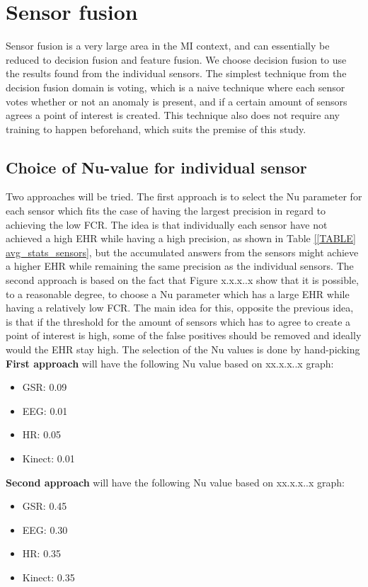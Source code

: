 \section{Sensor fusion}
Sensor fusion is a very large area in the MI context, and can essentially be reduced to decision fusion and feature fusion. 
We choose decision fusion to use the results found from the individual sensors.
The simplest technique from the decision fusion domain is voting, which is a naive technique where each sensor votes whether or not an anomaly is present, and if a certain amount of sensors agrees a point of interest is created. This technique also does not require any training to happen beforehand, which suits the premise of this study.

\subsection{Choice of Nu-value for individual sensor}
Two approaches will be tried. The first approach is to select the Nu parameter for each sensor which fits the case of having the largest precision in regard to achieving the low FCR. The idea is that individually each sensor have not achieved a high EHR while having a high precision, as shown in Table \ref{[TABLE] avg_stats_sensors}, but the accumulated answers from the sensors might achieve a higher EHR while remaining the same precision as the individual sensors.
The second approach is based on the fact that Figure x.x.x..x show that it is possible, to a reasonable degree, to choose a Nu parameter which has a large EHR while having a relatively low FCR. The main idea for this, opposite the previous idea, is that if the threshold for the amount of sensors which has to agree to create a point of interest is high, some of the false positives should be removed and ideally would the EHR stay high.
The selection of the Nu values is done by hand-picking \textbf{First approach} will have the following Nu value based on xx.x.x..x graph:
\begin{itemize}
\item GSR: 0.09
\item EEG: 0.01
\item HR: 0.05
\item Kinect: 0.01
\end{itemize}
\textbf{Second approach} will have the following Nu value based on xx.x.x..x graph:
\begin{itemize}
\item GSR: 0.45
\item EEG: 0.30
\item HR: 0.35
\item Kinect: 0.35
\end{itemize}

